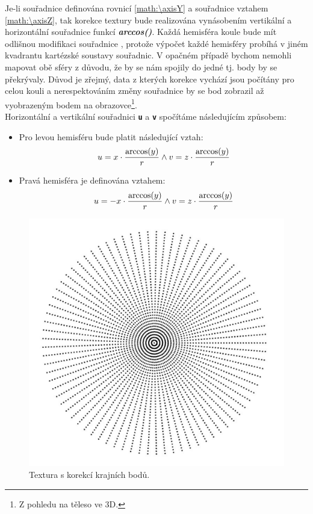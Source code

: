 Je-li  souřadnice \textit{\textbf{\axisY}} definována rovnicí \ref{math:\axisY} a souřadnice \textit{\textbf{\axisZ}} vztahem \ref{math:\axisZ}, tak korekce textury bude realizována vynásobením  vertikální a horizontální souřadnice funkcí \textit{\textbf{arccos(\axisY)}}. Každá hemisféra koule bude mít odlišnou modifikaci souřadnice \texttt{\textbf{\axisX{}}}, protože výpočet každé hemisféry probíhá v jiném kvadrantu kartézské soustavy souřadnic. V opačném případě bychom nemohli mapovat obě sféry z důvodu, že by se nám spojily do jedné tj. body by se překrývaly. Důvod je zřejmý, data z kterých korekce vychází jsou počítány pro celou kouli a nerespektováním změny souřadnice by se bod zobrazil až   vyobrazeným bodem na obrazovce\footnote{Z pohledu na těleso ve 3D.}. \\

Horizontální a vertikální souřadnici \texttt{\textbf{u}} a \texttt{\textbf{v}} spočítáme následujícím způsobem:




\begin{itemize}
	\item Pro levou hemisféru bude platit následující vztah:\\
		    $$u =  x{} \cdot \frac{\arccos(y{})}{r} \wedge v =  z{} \cdot \frac{\arccos(y{})}{r}$$   
		   
	\item Pravá hemisféra je definována vztahem:\\
			$$u =  -x{} \cdot \frac{\arccos(y{})}{r}\wedge v =  z{} \cdot \frac{\arccos(y{})}{r} $$ 
 
\end{itemize}
 

\begin{figure}[h]
	\label{img:texture_with_correction}
	\centering
	\includegraphics[scale=1.0,angle=0,width=0.6\linewidth]{obrazky-figures/texture_correction}
	\caption{Textura s korekcí krajních bodů.}
\end{figure}

